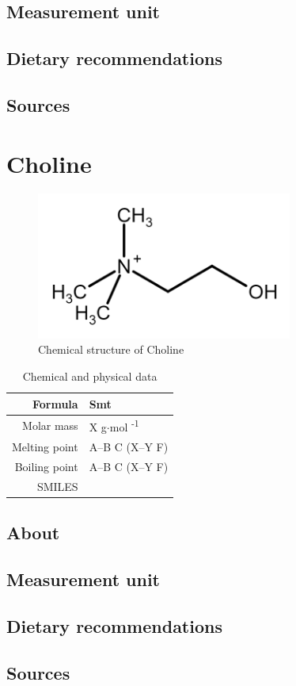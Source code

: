 \documentclass{book}
\begin{document}
\section{Measurement unit}


\section{Dietary recommendations}


\section{Sources}


\chapter{Choline}
\begin{figure}[h]
	\caption{Chemical structure of Choline}
	\centering \includegraphics[width=0.75\textwidth]{images/Choline_chemical_structure}
\end{figure}

\begin{table}[h]
	\caption{Chemical and physical data}
	\centering \begin{tabular}{| r | l |}
		\hline
		Formula & Smt\\ \hline
		Molar mass & X g$\cdot$mol \textsuperscript{-1}\\ \hline
		Melting point & A--B \degree C (X--Y \degree F)\\ \hline
		Boiling point & A--B \degree C (X--Y \degree F)\\ \hline
		SMILES & \\ \hline
	\end{tabular}
\end{table}
\newpage

\section{About}


\section{Measurement unit}


\section{Dietary recommendations}


\section{Sources}


\listoffigures


\listoftables
\end{document}
